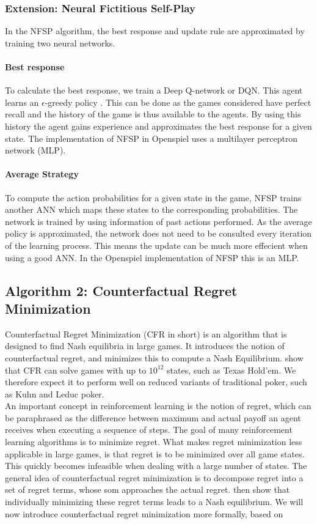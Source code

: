\documentclass[10pt,a4paper]{article}
\begin{document}
\subsubsection{Extension: Neural Fictitious Self-Play}
In the NFSP algorithm, the best response and update rule are approximated by training two neural networks.
\paragraph{Best response}
To calculate the best response, we train a Deep Q-network or DQN. This agent learns an $\epsilon$-greedy policy \cite{heinrichphd}. 
This can be done as the games considered have perfect recall and the history of the game is thus available to the agents. By using this history the agent gains experience and approximates the best response for a given state.
The implementation of NFSP in Openspiel uses a multilayer perceptron network (MLP).
\paragraph{Average Strategy}
To compute the action probabilities for a given state in the game, NFSP trains another ANN which maps these states to the corresponding probabilities. The network is trained by using information of past actions performed. As the average policy is approximated, the network does not need to be consulted every iteration of the learning process. This means the update can be much more effecient when using a good ANN.
In the Openspiel implementation of NFSP this is an MLP.
\subsection{Algorithm 2: Counterfactual Regret Minimization}
\label{sub:cfr}
Counterfactual Regret Minimization (CFR in short) is an algorithm that is designed to find Nash equilibria in large games. It introduces the notion of counterfactual regret, and minimizes this to compute a Nash Equilibrium. \citeauthor{cfr} \citep{cfr} show that CFR can solve games with up to $10^{12}$ states, such as Texas Hold'em. We therefore expect it to perform well on reduced variants of traditional poker, such as Kuhn and Leduc poker.\\

An important concept in reinforcement learning is the notion of regret, which can be paraphrased as the difference between maximum and actual payoff an agent receives when executing a sequence of steps. The goal of many reinforcement learning algorithms is to minimize regret. What makes regret minimization less applicable in large games, is that regret is to be minimized over all game states. This quickly becomes infeasible when dealing with a large number of states. The general idea of counterfactual regret minimization is to decompose regret into a set of regret terms, whose som approaches the actual regret. \citeauthor{cfr} then show that individually minimizing these regret terms leads to a Nash equilibrium. We will now introduce counterfactual regret minimization more formally, based on \citep{cfr_for_beginners}\\
\end{document}
